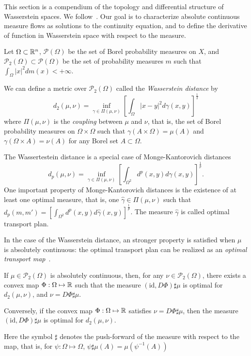 This section is a compendium of the topology and differential structure of
Wasserstein spaces. We follow~\cite{cardaliaguet2010notes,ambrosio2005gradient,ambrosio2021lectures}.
Our goal is to characterize absolute continuous measure flows as solutions to the continuity equation,
and to define the derivative of function in Wasserstein space with respect to the measure.

Let $\Omega \subset \mathbb{R}^n$, $\mathcal{P}(\Omega)$ be the set of Borel
probability measures on $X$, and $\mathcal{P}_2(\Omega) \subset \mathcal{P}(\Omega)$
be the set of probability measures $m$ such that $\int_\Omega |x|^2 dm(x) < + \infty$.

We can define a metric over $\mathcal{P}_2(\Omega)$ called the 
\textit{Wasserstein distance} by
\begin{equation}\label{prob_measures:wasserstein_distance}
    d_2(\mu, \nu) = \inf_{\gamma \in \Pi(\mu,\nu)} \left[ \int_\Omega |x - y|^2 d\gamma(x,y) \right]^{\frac{1}{2}}
\end{equation}
where $\Pi(\mu,\nu)$ is the \textit{coupling} between $\mu$  and $\nu$,
that is, the set of Borel probability measures on $\Omega \times \Omega$
such that $\gamma(A \times \Omega) = \mu(A)$ and $\gamma(\Omega \times A) = \nu(A)$
for any Borel set $A \subset \Omega$.

The Wassertestein distance is a special case of Monge-Kantorovich distances
\begin{equation*}
    d_p(\mu, \nu) = \inf_{\gamma \in \Pi(\mu, \nu)} \left[ \int_{\Omega^2} d^p(x,y) d\gamma(x,y)  \right]^{\frac{1}{p}}.
\end{equation*}
One important property of Monge-Kantorovich distances is the existence of at least
one optimal measure, that is, one $\hat  \gamma \in \Pi(\mu,\nu)$ such that
$d_p(m,m') = \left[ \int_{\Omega^2} d^p(x,y) d {\hat \gamma}(x,y) \right]^{\frac{1}{p}}$.
The measure $\hat \gamma$ is called optimal transport plan.

In the case of the Wasserstein distance, an stronger property is satisfied when 
$\mu$ is absolutely continuous: the optimal transport plan can be realized as
an \textit{optimal transport map}~\cite{cardaliaguet2010notes}.
\begin{theorem}
    If $\mu \in \mathcal{P}_2(\Omega)$ is absolutely continuous, then,
    for any $\nu \in \mathcal{P}_2(\Omega)$, there exists a convex map 
    $\Phi: \Omega \mapsto \mathbb{R} $ such that the measure
    $ (\text{id}, D\Phi)\sharp \mu $ is optimal for $d_2(\mu, \nu)$, and $\nu = D \Phi \sharp \mu$.

    Conversely, if the convex map $\Phi : \Omega \mapsto \mathbb{R}$ satisfies $\nu = D \Phi \sharp \mu$,
    then the measure $(\text{id}, D\Phi)\sharp \mu$ is optimal for $d_ 2(\mu,\nu)$.
\end{theorem}
Here the symbol $\sharp$ denotes the push-forward of the measure with respect to the map,
that is, for $\psi : \Omega \mapsto \Omega$, $\psi \sharp \mu(A) = \mu(\psi^{-1}(A))$

